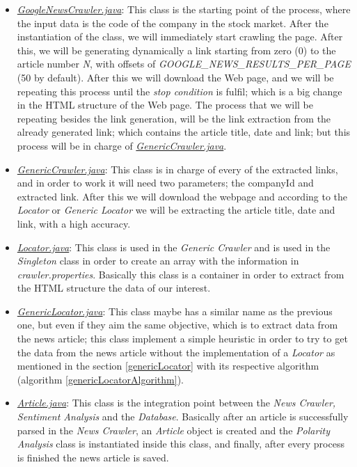 \begin{itemize}
	\item \emph{\ul{GoogleNewsCrawler.java}}\label{GoogleNewsCrawler}: This class is the starting point of the process, where the input data is the code of the company in the stock market. After the instantiation of the class, we will immediately start crawling the page. After this, we will be generating dynamically a link starting from zero (0) to the article number \emph{N}, with offsets of \emph{GOOGLE\_NEWS\_RESULTS\_PER\_PAGE} (50 by default). After this we will download the Web page, and we will be repeating this process until the \emph{stop condition} is fulfil; which is a big change in the HTML structure of the Web page. The process that we will be repeating besides the link generation, will be the link extraction from the already generated link; which contains the article title, date and link; but this process will be in charge of \emph{\ul{GenericCrawler.java}}.
	\item \emph{\ul{GenericCrawler.java}}: This class is in charge of every of the extracted links, and in order to work it will need two parameters; the companyId and extracted link. After this we will download the webpage and according to the \emph{Locator} or \emph{Generic Locator} we will be extracting the article title, date and link, with a high accuracy.	
	\item \emph{\ul{Locator.java}}: This class is used in the \emph{Generic Crawler} and is used in the \emph{Singleton} class in order to create an array with the information in \emph{crawler.properties}. Basically this class is a container in order to extract from the HTML structure the data of our interest.
	\item \emph{\ul{GenericLocator.java}}: This class maybe has a similar name as the previous one, but even if they aim the same objective, which is to extract data from the news article; this class implement a simple heuristic in order to try to get the data from the news article without the implementation of a \emph{Locator} as mentioned in the section \ref{genericLocator} with its respective algorithm (algorithm \ref{genericLocatorAlgorithm}).
	\item \emph{\ul{Article.java}}: This class is the integration point between the \emph{News Crawler, Sentiment Analysis} and the  \emph{Database}. Basically after an article is successfully parsed in the \emph{News Crawler}, an \emph{Article} object is created and the \emph{Polarity Analysis} class is instantiated inside this class, and finally, after every process is finished the news article is saved. 
\end{itemize}

